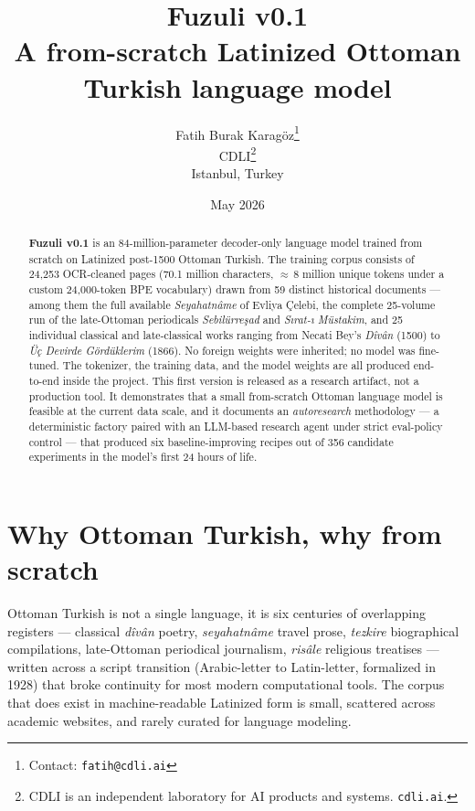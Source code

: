 \documentclass[11pt,a4paper]{article}
\title{\textbf{Fuzuli v0.1} \\[0.3em]
  \large A from-scratch Latinized Ottoman Turkish language model}
\author{
  Fatih Burak Karagöz\thanks{Contact: \texttt{fatih@cdli.ai}} \\[0.2em]
  \normalsize\textsc{CDLI}\thanks{CDLI is an independent laboratory for AI
    products and systems. \texttt{cdli.ai}.} \\
  \normalsize Istanbul, Turkey
}
\date{May 2026}
\begin{document}
\maketitle

\begin{abstract}
\noindent
\textbf{Fuzuli v0.1} is an 84-million-parameter decoder-only language model
trained from scratch on Latinized post-1500 Ottoman Turkish. The training
corpus consists of 24,253 OCR-cleaned pages (70.1 million characters,
${\approx}\,8$ million unique tokens under a custom 24,000-token BPE
vocabulary) drawn from 59 distinct historical documents — among them the full
available \emph{Seyahatnâme} of Evliya Çelebi, the complete 25-volume run of
the late-Ottoman periodicals \emph{Sebilürreşad} and \emph{Sırat-ı Müstakim},
and 25 individual classical and late-classical works ranging from Necati
Bey's \emph{Dîvân} (1500) to \emph{Üç Devirde Gördüklerim} (1866). No
foreign weights were inherited; no model was fine-tuned. The tokenizer, the
training data, and the model weights are all produced end-to-end inside the
project. This first version is released as a research artifact, not a
production tool. It demonstrates that a small from-scratch Ottoman language
model is feasible at the current data scale, and it documents an
\emph{autoresearch} methodology --- a deterministic factory paired with an
LLM-based research agent under strict eval-policy control --- that produced
six baseline-improving recipes out of 356 candidate experiments in the
model's first 24 hours of life.
\end{abstract}

\section{Why Ottoman Turkish, why from scratch}

Ottoman Turkish is not a single language, it is six centuries of overlapping
registers --- classical \emph{dîvân} poetry, \emph{seyahatnâme} travel prose,
\emph{tezkire} biographical compilations, late-Ottoman periodical journalism,
\emph{risâle} religious treatises --- written across a script transition
(Arabic-letter to Latin-letter, formalized in 1928) that broke continuity for
most modern computational tools. The corpus that does exist in
machine-readable Latinized form is small, scattered across academic
websites, and rarely curated for language modeling.
\end{document}
